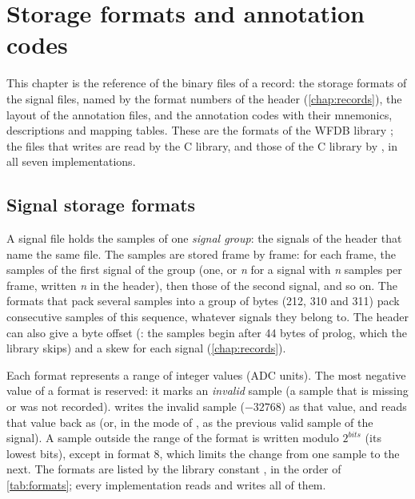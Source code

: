 \chapter{Storage formats and annotation codes}
\label{chap:formats}

This chapter is the reference of the binary files of a record: the storage formats of the
signal files, named by the format numbers of the header (\cref{chap:records}), the layout
of the annotation files, and the annotation codes with their mnemonics, descriptions and
mapping tables. These are the formats of the WFDB library \wfdbversion{}; the files that
\wfdbx{} writes are read by the C library, and those of the C library by \wfdbx{}, in all
seven implementations.

\section{Signal storage formats}
\label{sec:formats-signal}

A signal file holds the samples of one \emph{signal group}: the signals of the header that
name the same file. The samples are stored frame by frame: for each frame, the samples of
the first signal of the group (one, or \textit{n} for a signal with \textit{n} samples per
frame, written \textit{n} in the header), then those of the second signal, and so
on. The formats that pack several samples into a group of bytes (212, 310 and 311) pack
consecutive samples of this sequence, whatever signals they belong to. The header can also
give a byte offset (: the samples begin after 44 bytes of prolog, which the
library skips) and a skew for each signal (\cref{chap:records}).

Each format represents a range of integer values (ADC units). The most negative value of a
format is reserved: it marks an \emph{invalid} sample (a sample that is missing or was not
recorded).  writes the invalid sample  ($-32768$) as
that value, and  reads that value back as  (or, in
the  mode of , as the previous valid sample of the signal).
A sample outside the range of the format is written modulo $2^{\mathit{bits}}$ (its lowest
bits), except in format 8, which limits the change from one sample to the next. The formats
are listed by the library constant , in the order of
\cref{tab:formats}; every implementation reads and writes all of them.


